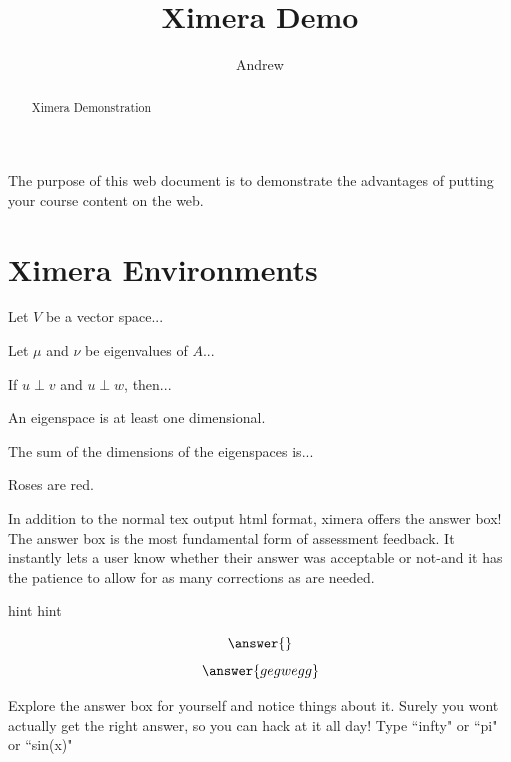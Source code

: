 \documentclass{ximera}
\title{Ximera Demo}
\author{Andrew}
\begin{document}
\begin{abstract}
    Ximera Demonstration
\end{abstract}


\maketitle

The purpose of this web document is to demonstrate the advantages of putting your course content on the web.

\section{Ximera Environments}

\begin{theorem}
    Let $V$ be a vector space...
\end{theorem}

\begin{proposition}
    Let $\mu$ and $\nu$ be eigenvalues of $A$...
\end{proposition}

\begin{lemma}
    If $u \perp v$ and $u \perp w$, then...
\end{lemma}

\begin{corollary}
    An eigenspace is at least one dimensional.
\end{corollary}

\begin{remark}
    The sum of the dimensions of the eigenspaces is...
\end{remark}

\begin{example}
    Roses are red.
\end{example}
In addition to the normal tex output html format, ximera offers the answer box! The answer box is the most fundamental form of assessment feedback. It instantly lets a user know whether their answer was acceptable or not-and it has the patience to allow for as many corrections as are needed.
\begin{problem}
    \begin{hint}
        hint hint
    \end{hint}
    \[
    \answer{}
    \]
    \[
    \answer{gegwegg}
    \]
\end{problem}

Explore the answer box for yourself and notice things about it. Surely you wont actually get the right answer, so you can hack at it all day! Type ``infty" or ``pi" or ``sin(x)"
\end{document}
